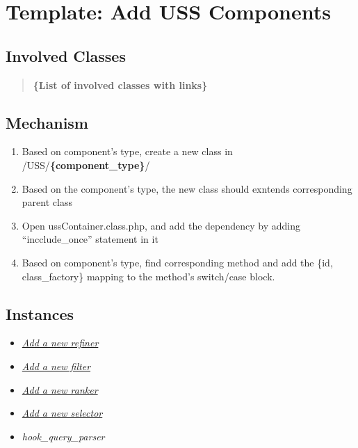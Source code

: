 \documentclass[letterpaper,10pt,english]{sphinxmanual}
\begin{document}
\section{Template: Add USS Components}
\label{docs/hooks/t_uss_components:template-add-uss-components}\label{docs/hooks/t_uss_components::doc}\label{docs/hooks/t_uss_components:hook-template-uss}

\subsection{Involved Classes}
\label{docs/hooks/t_uss_components:involved-classes}\begin{quote}

\textbf{\{List of involved classes with links\}}
\end{quote}


\subsection{Mechanism}
\label{docs/hooks/t_uss_components:mechanism}\begin{enumerate}
\item {} 
Based on component's type, create a new class in /USS/\textbf{\{component\_type\}}/

\item {} 
Based on the component's type, the new class should exntends corresponding parent class

\item {} 
Open ussContainer.class.php, and add the dependency by adding ``incclude\_once'' statement in it

\item {} 
Based on component's type, find corresponding method and add the \{id, class\_factory\} mapping to the method's switch/case block.

\end{enumerate}


\subsection{Instances}
\label{docs/hooks/t_uss_components:instances}\begin{itemize}
\item {} 
{\hyperref[docs/hooks/new_refiner:hook-refiner]{\emph{Add a new refiner}}}

\item {} 
{\hyperref[docs/hooks/new_filter:hook-filter]{\emph{Add a new filter}}}

\item {} 
{\hyperref[docs/hooks/new_ranker:hook-ranker]{\emph{Add a new ranker}}}

\item {} 
{\hyperref[docs/hooks/new_selector:hook-selector]{\emph{Add a new selector}}}

\item {} 
\emph{hook\_query\_parser}

\end{itemize}
\end{document}
